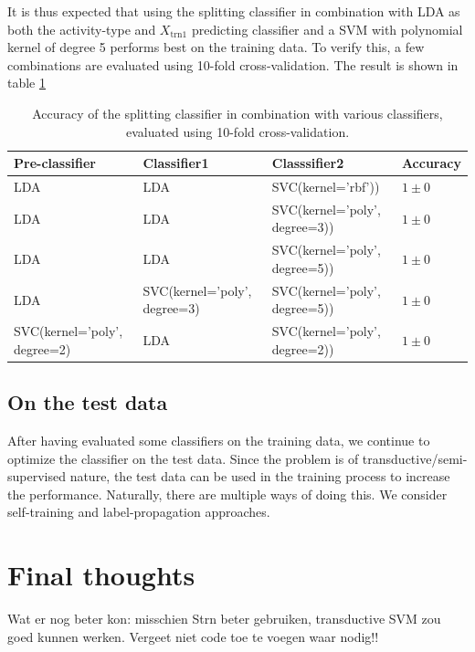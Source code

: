 \documentclass [a4paper] {report}
\begin{document}
	\noindent
	It is thus expected that using the splitting classifier in combination with LDA as both the activity-type and $X_{\text{trn1}}$ predicting classifier and a SVM with polynomial kernel of degree 5 performs best on the training data. To verify this, a few combinations are evaluated using 10-fold cross-validation. The result is shown in table \ref{tab:Xtrn_final}
	
	\begin{table}[H]
		\centering
		\caption{Accuracy of the splitting classifier in combination with various classifiers, evaluated using 10-fold cross-validation.}
		\label{tab:Xtrn_final}
		\begin{tabular}{l|l|l|l}
			Pre-classifier 					& Classifier1 					&  Classsifier2								& Accuracy  \\ \hline
			LDA 							& LDA							& SVC(kernel='rbf')) 						& $1 \pm 0 $\\
			LDA 							& LDA							& SVC(kernel='poly', degree=3)) 			& $1 \pm 0 $\\
			LDA 							& LDA							& SVC(kernel='poly', degree=5)) 			& $1 \pm 0 $\\
			LDA 							& SVC(kernel='poly', degree=3)	& SVC(kernel='poly', degree=5)) 			& $1 \pm 0 $\\
			SVC(kernel='poly', degree=2) 	& LDA							& SVC(kernel='poly', degree=2)) 			& $1 \pm 0 $\\
		\end{tabular}		
	\end{table}
	
	
	\subsection*{On the test data}
	After having evaluated some classifiers on the training data, we continue to optimize the classifier on the test data. Since the problem is of transductive/semi-supervised nature, the test data can be used in the training process to increase the performance. Naturally, there are multiple ways of doing this. We consider self-training and label-propagation approaches.
	
	
	
	\section*{Final thoughts}
	Wat er nog beter kon: misschien Strn beter gebruiken, transductive SVM zou goed kunnen werken.
	Vergeet niet code toe te voegen waar nodig!!
	
	
\end{document}
